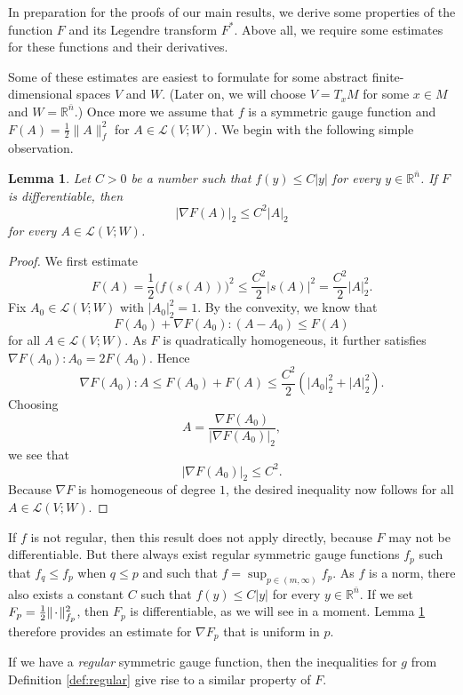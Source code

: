 \documentclass[a4paper]{article}
\newcommand{\R}{\mathbb{R}}
\newcommand{\ndim}{{\bar{n}}}
\newcommand{\Lin}{\mathcal{L}}
\newcommand{\blank}{{\mkern 2mu\cdot\mkern 2mu}}
\newtheorem{lemma}[theorem]{Lemma}
\theoremstyle{definition}
\theoremstyle{remark}
\begin{document}
In preparation for the proofs of our main results, we derive some properties of
the function $F$ and its Legendre transform $F^*$. Above all, we require some estimates for
these functions and their derivatives.

Some of these estimates are easiest to formulate for some abstract finite-dimensional spaces $V$ and $W$. (Later on, we will choose $V = T_x M$ for some $x \in M$
and $W = \R^\ndim$.) Once more we assume that $f$ is a symmetric gauge function and $F(A) = \frac{1}{2} \|A\|_f^2$ for $A \in \Lin(V; W)$. We begin with the following simple observation.

\begin{lemma} \label{lem:F-gradient-estimate}
Let $C > 0$ be a number such that $f(y) \le C|y|$ for every $y \in \R^\ndim$.
If $F$ is differentiable, then
\[
|\nabla F(A)|_2 \le C^2 |A|_2
\]
for every $A \in \Lin(V; W)$.
\end{lemma}

\begin{proof}
We first estimate
\[
F(A) = \frac{1}{2} \bigl(f(s(A))\bigr)^2 \le \frac{C^2}{2} |s(A)|^2 = \frac{C^2}{2} |A|_2^2.
\]
Fix $A_0 \in \Lin(V; W)$ with $|A_0|_2^2 = 1$. By the convexity, we know that
\[
F(A_0) + \nabla F(A_0) : (A - A_0) \le F(A)
\]
for all $A \in \Lin(V; W)$. As $F$ is quadratically homogeneous, it further satisfies $\nabla F(A_0) : A_0 = 2 F(A_0)$. Hence
\[
\nabla F(A_0) : A \le F(A_0) + F(A) \le \frac{C^2}{2}(|A_0|_2^2 + |A|_2^2).
\]
Choosing
\[
A = \frac{\nabla F(A_0)}{|\nabla F(A_0)|_2},
\]
we see that
\[
|\nabla F(A_0)|_2 \le C^2.
\]
Because $\nabla F$ is homogeneous of degree $1$, the desired inequality now follows for all $A \in \Lin(V; W)$.
\end{proof}

If $f$ is not regular, then this result does not apply directly, because
$F$ may not be differentiable. But there always exist regular symmetric gauge
functions $f_p$ such that $f_q \le f_p$ when $q \le p$ and such that
$f = \sup_{p \in (m, \infty)} f_p$. As $f$ is a norm, there also
exists a constant $C$ such that
$f(y) \le C|y|$ for every $y \in \R^\ndim$. If we set $F_p = \frac{1}{2} \|\blank\|_{f_p}^2$, then $F_p$ is differentiable, as we will see in a moment.
Lemma \ref{lem:F-gradient-estimate} therefore
provides an estimate for $\nabla F_p$ that is uniform in $p$.

If we have a \emph{regular} symmetric gauge function, then the inequalities for $g$
from Definition \ref{def:regular} give rise to a similar property of $F$.
\end{document}
